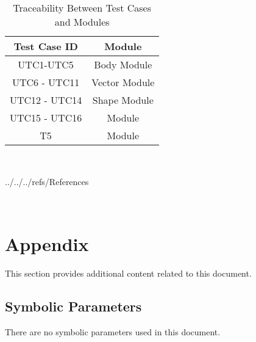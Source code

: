 \documentclass[12pt, titlepage]{article}
\begin{document}
\begin{table} [h!]
	
	\centering
	
	\begin{tabular}{|c|c|}
		
		\hline	
		
		\textbf{Test Case ID} & \textbf{Module}\\
		
		\hline 
		
	
		UTC1-UTC5& Body Module\\ \hline
		
		UTC6 - UTC11& Vector  Module\\ \hline
		
		UTC12 - UTC14&  Shape Module\\ \hline
		
		UTC15 - UTC16& Module\\ \hline
		
		T5& Module\\ \hline
		
	\end{tabular}
	
	\caption{Traceability Between Test Cases and Modules}
	
	\label{Table:Traceability} 
	
\end{table}

~\newpage


 {../../../refs/References}

~\newpage



\section{Appendix}



This section provides additional content related to this document.



\subsection{Symbolic Parameters}



There are no symbolic parameters used in this document.
\end{document}
